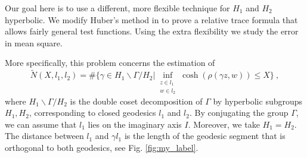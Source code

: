 \documentclass[a4paper,11pt]{amsart}
\theoremstyle{definition}
\begin{document}
 Our goal here is to use a different, more flexible technique for $H_1$ and $H_2$ hyperbolic.  We modify Huber's method in \cite{Hu98} to prove a relative trace formula that allows fairly general test functions. Using the extra flexibility we study the error in mean square.
 
 More specifically, this problem concerns the estimation of
$$\widetilde{N}(X,l_1,l_2)= \# \Big\{\gamma \in  H_1\backslash \Gamma /H_2 | \inf_{\substack{z\in l_1 \\ w\in l_2}}\cosh({\rho} (\gamma z,w))\le X\Big\} \: ,$$
where $H_1\backslash\Gamma/H_2$ is the double coset decomposition of $\Gamma$ by hyperbolic subgroups $H_1 , H_2$, corresponding to closed geodesics $l_1$ and $l_2$. By conjugating the group $\Gamma$, we can assume that $l_1$ lies on the imaginary axis $I$. Moreover, we take $H_1=H_2$. The distance between $l_1$ and $\gamma l_1$ is the length of the geodesic segment that is orthogonal to both geodesics, see Fig. \ref{fig:my_label}.
\end{document}
